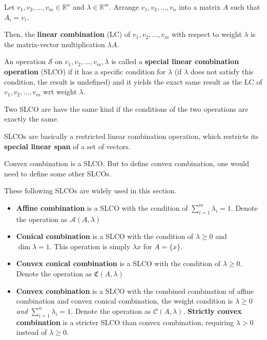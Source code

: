 \begin{definition}
  Let \( v_{1}, v_{2}, \ldots , v_{m} \in \mathbb{R}^{n} \) and \( \lambda \in
  \mathbb{R}^{m} \). Arrange \( v_{1}, v_{2}, \ldots , v_{n} \) into a matrix \(
  A\) such that \( A_{i} = v_{i} \).

  Then, the \textbf{linear combination} (LC) of \( v_{1}, v_{2}, \ldots, v_{m}
  \) with respect to weight \( \lambda \) is the matrix-vector multiplication \(
  \lambda A\).

  An operation \( \mathcal{S} \) on \( v_{1}, v_{2}, \ldots , v_{m}, \lambda \)
  is called a \textbf{special linear combination operation} (SLCO) if it has a specific
  condition for \( \lambda \) (if \( \lambda \) does not satisfy this condition,
  the result is undefined) and it yields the exact same result as the LC of \(
  v_{1}, v_{2}, \ldots , v_{m} \) wrt weight \( \lambda \).

  Two SLCO are have the same kind if the conditions of the two operations are
  exactly the same.
\end{definition}

SLCOs are basically a restricted linear combination operation, which restricts
its \textbf{special linear span} of a set of vectors.

Convex combination is a SLCO. But to define convex combination, one would need
to define some other SLCOs.

\begin{definition}
  These following SLCOs are widely used in this section.
\begin{itemize}
  \item \textbf{Affine combination} is a SLCO with the condition of \( \sum_{i =
    1}^{m} \lambda_{i} = 1 \). Denote the operation as \(
    \mathcal{A}(A, \lambda) \)
  \item \textbf{Conical combination} is a SLCO with the condition of \( \lambda
    \ge 0 \) and \( \dim \lambda = 1 \). This operation is simply
    \( \lambda x \) for \( A = \{x\}   \).
  \item \textbf{Convex conical combination} is a SLCO with the condition of
    \( \lambda \ge  0\). Denote the operation as \( \mathfrak{C}(A, \lambda)
    \)
  \item \textbf{Convex combination} is a SLCO with the combined combination of
    affine combination and convex conical combination, the weight condition is \(
    \lambda \ge 0 \) \textit{and} \( \sum_{i = 1}^{n} \lambda_{i} = 1 \). Denote
    the operation as \( \mathcal{C}(A, \lambda) \). \textbf{Strictly convex
    combination} is a stricter SLCO than convex combination, requiring
    \( \lambda > 0 \) instead of \( \lambda \ge 0 \).

\end{itemize}
\end{definition}

